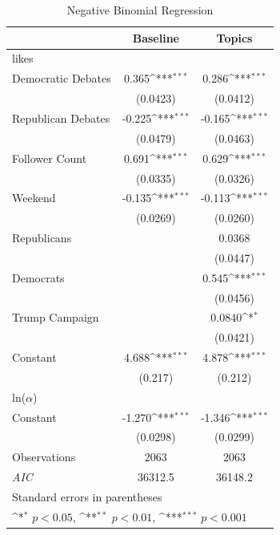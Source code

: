 \documentclass[letterpaper]{article}
\begin{document}
\begin{table}[H]\centering
\setlength{\tabcolsep}{13.3pt}
\renewcommand{\arraystretch}{1.1}
\def\sym#1{\ifmmode^{#1}\else\(^{#1}\)\fi}
\caption{Negative Binomial Regression}
\label{nb}
\begin{tabular}{l*{2}{c}}
\hline\hline
                    &\multicolumn{1}{c}{Baseline}&\multicolumn{1}{c}{Topics}\\
\hline
likes               &                     &                     \\
Democratic Debates            &       0.365\sym{***}&       0.286\sym{***}\\
                    &    (0.0423)         &    (0.0412)         \\
Republican Debates            &      -0.225\sym{***}&      -0.165\sym{***}\\
                    &    (0.0479)         &    (0.0463)         \\
Follower Count    & 0.691\sym{***}&       0.629\sym{***}\\
                    &  (0.0335)         &    (0.0326)         \\
Weekend             &      -0.135\sym{***}&      -0.113\sym{***}\\
                    &    (0.0269)         &    (0.0260)         \\
Republicans         &                     &      0.0368         \\
                    &                     &    (0.0447)         \\
Democrats           &                     &       0.545\sym{***}\\
                    &                     &    (0.0456)         \\
Trump Campaign            &                     &      0.0840\sym{*}  \\
                    &                     &    (0.0421)         \\
Constant            &       4.688\sym{***}&       4.878\sym{***}\\
                    &     (0.217)         &     (0.212)         \\
\hline
ln($\alpha$)             &                     &                     \\
Constant            &      -1.270\sym{***}&      -1.346\sym{***}\\
                    &    (0.0298)         &    (0.0299)         \\
\hline
Observations        &        2063         &        2063         \\
\textit{AIC}        &     36312.5         &     36148.2         \\
\hline\hline
\multicolumn{3}{l}{\footnotesize Standard errors in parentheses}\\
\multicolumn{3}{l}{\footnotesize \sym{*} \(p<0.05\), \sym{**} \(p<0.01\), \sym{***} \(p<0.001\)}\\
\end{tabular}
\end{table}
\end{document}

